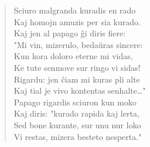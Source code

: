 \begin{verse}
                  Sciuro malgranda kuradis en rado\\
                  Kaj homojn amuzis per sia kurado.\\
                  Kaj jen al papago \^gi diris fiere:\\
                  "Mi vin, mizerulo, beda\u uras sincere:\\
                  Kun kora doloro eterne mi vidas,\\
                  Ke tute senmove sur ringo vi sidas!\\
                  Rigardu: jen \^ciam mi kuras pli alte\\
                  Kaj tial je vivo kontentas senhalte\dots"\\
                  Papago rigardis sciuron kun moko\\
                  Kaj diris: "kurado rapida kaj lerta,\\
                  Sed bone kurante, sur unu nur loko\\
                  Vi restas, mizera besteto nesperta."

\end{verse}


\smallrule{}
